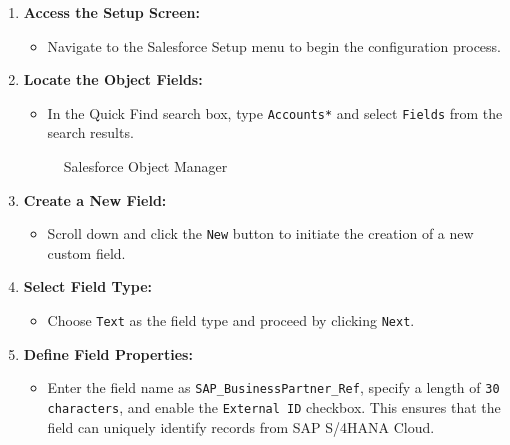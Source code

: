 \begin{enumerate}
    \item \textbf{Access the Setup Screen:}
    \begin{itemize}
        \item Navigate to the Salesforce Setup menu to begin the configuration process.
    \end{itemize}

    \item \textbf{Locate the Object Fields:}
    \begin{itemize}
        \item In the Quick Find search box, type \texttt{Accounts*} and select \texttt{Fields} from the search results.
    \end{itemize}

    \begin{figure}[H]
    \centering
    \caption{Salesforce Object Manager}
    
    \end{figure}

    \item \textbf{Create a New Field:}
    \begin{itemize}
        \item Scroll down and click the \texttt{New} button to initiate the creation of a new custom field.
    \end{itemize}

    \item \textbf{Select Field Type:}
    \begin{itemize}
        \item Choose \texttt{Text} as the field type and proceed by clicking \texttt{Next}.
    \end{itemize}

    \item \textbf{Define Field Properties:}
    \begin{itemize}
        \item Enter the field name as \texttt{SAP\_BusinessPartner\_Ref}, specify a length of \texttt{30 characters}, and enable the \texttt{External ID} checkbox. This ensures that the field can uniquely identify records from SAP S/4HANA Cloud.
    \end{itemize}
    

\end{enumerate}
